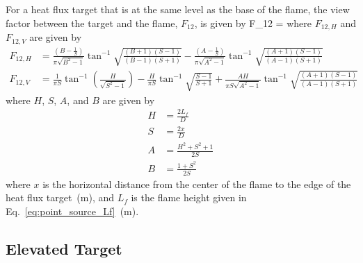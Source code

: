 \noindent For a heat flux target that is at the same level as the base of the flame, the view factor between the target and the flame, $F_{12}$, is given by
\be
F_{12} = 
\label{eq:solid_flame_F12_HV}
\ee
where $F_{12, H}$ and $F_{12, V}$ are given by
\begin{align}
F_{12, H} &= \frac{\left( B - \frac{1}{S} \right)}{\pi \sqrt{B^2 - 1}} \tan^{-1} \sqrt{ \frac{(B+1)(S-1)}{(B-1)(S+1)} } -
\frac{\left( A - \frac{1}{S} \right)}{\pi \sqrt{A^2 - 1}} \tan^{-1} \sqrt{ \frac{(A+1)(S-1)}{(A-1)(S+1)} } \\
F_{12, V} &= \frac{1}{\pi S} \tan^{-1} \left( \frac{H}{\sqrt{S^2-1}} \right) - \frac{H}{\pi S} \tan^{-1} \sqrt{\frac{S-1}{S+1}} +
\frac{A H}{\pi S \sqrt{A^2-1}} \tan^{-1} \sqrt{\frac{(A+1)(S-1)}{(A-1)(S+1)}}
\label{eq:solid_flame_F12_H_V}
\end{align}
where $H$, $S$, $A$, and $B$ are given by
\begin{align}
H &= \frac{2 L_f}{D}            \\
S &= \frac{2 x}{D}              \\
A &= \frac{H^2 + S^2 + 1}{2 S}  \\
B &= \frac{1+S^2}{2 S}
\label{eq:solid_flame_H_S_A_B}
\end{align}
where $x$ is the horizontal distance from the center of the flame to the edge of the heat
flux target~(\si{m}), and $L_f$ is the flame height given in Eq.~\ref{eq:point_source_Lf}~(\si{m}).


\clearpage


\subsection*{Elevated Target}

